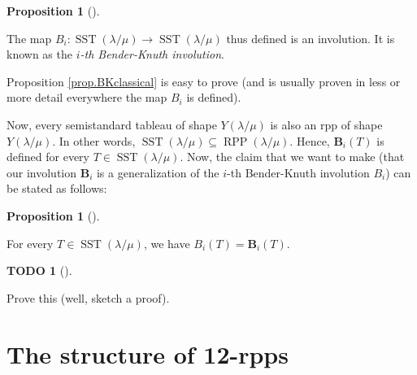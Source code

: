 \documentclass[numbers=enddot,12pt,final,onecolumn,notitlepage]{scrartcl}%
\theoremstyle{definition}
\newtheorem{prop}[theo]{Proposition}
\newenvironment{proposition}[1][]
{\begin{prop}[#1]\begin{leftbar}}
{\end{leftbar}\end{prop}}
\newtheorem{quest}[theo]{TODO}
\newenvironment{todo}[1][]
{\begin{quest}[#1]\begin{leftbar}}
{\end{leftbar}\end{quest}}
\begin{document}
\begin{proposition}
\label{prop.BKclassical}The map $B_{i}:\operatorname*{SST}\left(  \lambda
/\mu\right)  \rightarrow\operatorname*{SST}\left(  \lambda/\mu\right)  $ thus
defined is an involution. It is known as the $i$\textit{-th Bender-Knuth
involution}.
\end{proposition}

Proposition \ref{prop.BKclassical} is easy to prove (and is usually proven in
less or more detail everywhere the map $B_{i}$ is defined).

Now, every semistandard tableau of shape $Y\left(  \lambda/\mu\right)  $ is
also an rpp of shape $Y\left(  \lambda/\mu\right)  $. In other words,
$\operatorname*{SST}\left(  \lambda/\mu\right)  \subseteq\operatorname*{RPP}%
\left(  \lambda/\mu\right)  $. Hence, $\mathbf{B}_{i}\left(  T\right)  $ is
defined for every $T\in\operatorname*{SST}\left(  \lambda/\mu\right)  $. Now,
the claim that we want to make (that our involution $\mathbf{B}_{i}$ is a
generalization of the $i$-th Bender-Knuth involution $B_{i}$) can be stated as follows:

\begin{proposition}
\label{prop.BK=BK}For every $T\in\operatorname*{SST}\left(  \lambda
/\mu\right)  $, we have $B_{i}\left(  T\right)  =\mathbf{B}_{i}\left(
T\right)  $.
\end{proposition}

\begin{todo}
Prove this (well, sketch a proof).
\end{todo}



\section{The structure of 12-rpps}
\def\cut{{\operatorname*{cut}}} %
\def\ceq{{\operatorname*{ceq}}}
\def\ircont{{\operatorname*{ircont}}}
\def\ceqvar{{{ceq}}} %
\def\cutvar{{{\nu}}} %
\def\supp{{\operatorname*{supp}}}
\def\NS{{\operatorname*{NS}}}
\def\g{{\widetilde{g}}}
\def\t{{\mathbf{t}}}
\def\lm{{\lambda/\mu}}
\def\lmp{{(\lambda/\mu)}}
\def\N{{\mathbb{N}}}
\def\Z{\mathbb{Z}}

\def\OneTwoRPP{{\operatorname*{RPP}^{12}\left(  \lambda/\mu\right)}}
\def\OneTwoRPPCutvar{{\operatorname*{RPP}^{12}\left(  \lambda/\mu ;\cutvar \right)}}
\def\flip{{\operatorname*{flip}}}
\end{document}

